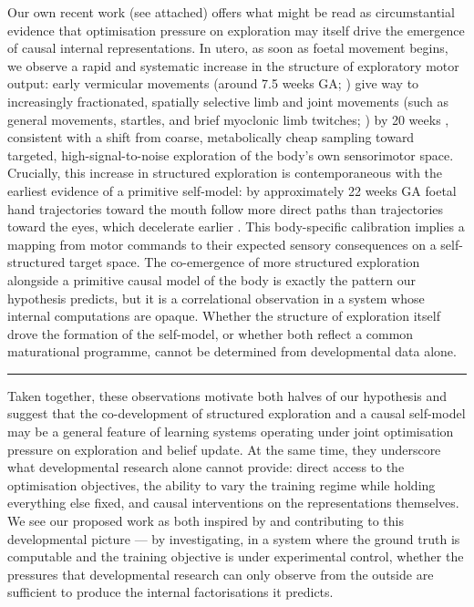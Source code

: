 \documentclass[12pt, a4paper]{article}
\begin{document}
Our own recent work (see attached) offers what might be read as circumstantial evidence
that optimisation pressure on exploration may itself drive the emergence of causal internal
representations. In utero, as soon as foetal movement begins, we observe a rapid and
systematic increase in the structure of exploratory motor output: early vermicular movements
(around 7.5 weeks GA; \citealt{prechtl1985ultrasound}) give way to increasingly
fractionated, spatially selective limb and joint movements (such as general movements,
startles, and brief myoclonic limb twitches; \citealt{devries1982emergence,
piontelli2010conclusions, tiriac2014selfgenerated, lindemann2016spindle}) by 20 weeks
\citep{devries1982emergence}, consistent with a shift from coarse, metabolically cheap
sampling toward targeted, high-signal-to-noise exploration of the body's own sensorimotor
space. Crucially, this increase in structured exploration is contemporaneous with the
earliest evidence of a primitive self-model: by approximately 22 weeks GA foetal hand
trajectories toward the mouth follow more direct paths than trajectories toward the eyes,
which decelerate earlier \citep{zoia2007evidence}. This body-specific calibration implies a
mapping from motor commands to their expected sensory consequences on a self-structured
target space. The co-emergence of more structured exploration alongside a primitive causal
model of the body is exactly the pattern our hypothesis predicts, but it is a correlational
observation in a system whose internal computations are opaque. Whether the structure of
exploration itself drove the formation of the self-model, or whether both reflect a common
maturational programme, cannot be determined from developmental data alone.

\bigskip\noindent\rule{\textwidth}{0.4pt}\bigskip

Taken together, these observations motivate both halves of our hypothesis and suggest that
the co-development of structured exploration and a causal self-model may be a general
feature of learning systems operating under joint optimisation pressure on exploration and
belief update. At the same time, they underscore what developmental research alone cannot
provide: direct access to the optimisation objectives, the ability to vary the training
regime while holding everything else fixed, and causal interventions on the representations
themselves. We see our proposed work as both inspired by and contributing to this
developmental picture --- by investigating, in a system where the ground truth is computable
and the training objective is under experimental control, whether the pressures that
developmental research can only observe from the outside are sufficient to produce the
internal factorisations it predicts.



\end{document}
